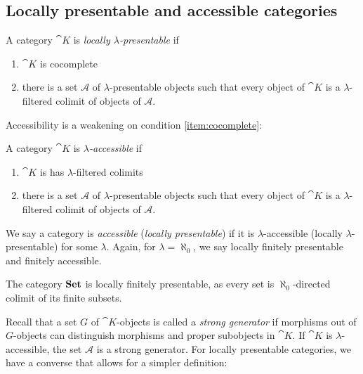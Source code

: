 \subsection{Locally presentable and accessible categories}


\begin{Definition}
A category $\cat K$ is \emph{locally $\lambda$-presentable} if
\begin{enumerate}
\item $\cat K$ is cocomplete \label{item:cocomplete}
\item there is a set $\mathcal A$ of $\lambda$-presentable objects such that every object of $\cat K$ is a $\lambda$-filtered colimit of objects of $\mathcal A$.
\end{enumerate}
\end{Definition}

Accessibility is a weakening on condition \ref{item:cocomplete}:

\begin{Definition}
A category $\cat K$ is \emph{$\lambda$-accessible} if
\begin{enumerate}
\item $\cat K$ is has $\lambda$-filtered colimits
\item there is a set $\mathcal A$ of $\lambda$-presentable objects such that every object of $\cat K$ is a $\lambda$-filtered colimit of objects of $\mathcal A$.
\end{enumerate}
\end{Definition}

We say a category is \emph{accessible} (\emph{locally presentable}) if it is $\lambda$-accessible (locally $\lambda$-presentable) for some $\lambda$. Again, for $\lambda = \aleph_0$, we say locally finitely presentable and finitely accessible. 

\begin{Example}
The category $\mathbf{Set}$ is locally finitely presentable, as every set is $\aleph_0$-directed colimit of its finite subsets.
\end{Example}

Recall that a set $G$ of $\cat K$-objects is called a \emph{strong generator} if morphisms out of $G$-objects can distinguish morphisms and proper subobjects in $\cat K$. If $\cat K$ is $\lambda$-accessible, the set $\mathcal A$ is a strong generator. For locally presentable categories, we have a converse that allows for a simpler definition:

